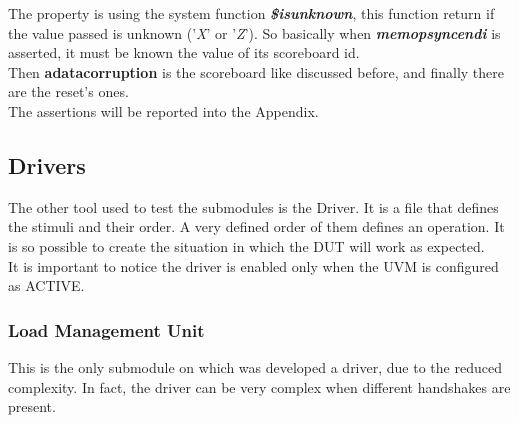 The property is using the system function \textbf{\emph{\$isunknown}}, this function return if the value passed is unknown ('\emph{X}' or '\emph{Z}'). So basically when \textbf{\emph{memop\+sync\+end\+i}} is asserted, it must be known the value of its scoreboard id.\\


Then  \textbf{a\+data\+corruption} is the scoreboard like discussed before, and finally there are the reset's ones.\\
The assertions will be reported into the Appendix.\\




\subsection{Drivers}
The other tool used to test the submodules is the Driver. It is a file that defines the stimuli and their order. A very defined order of them defines an operation. It is so possible to create the situation in which the DUT will work as expected.\\

It is important to notice the driver is enabled only when the UVM is configured as ACTIVE.

\subsubsection{Load Management Unit}
This is the only submodule on which was developed a driver, due to the reduced complexity. In fact, the driver can be very complex when different handshakes are present.\\

